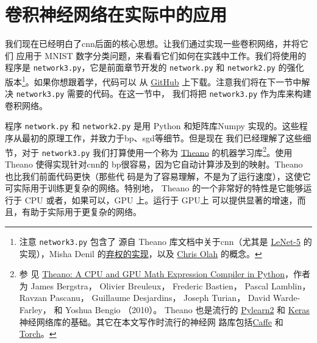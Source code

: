 \section{卷积神经网络在实际中的应用}
\label{seq:convolutional_neural_networks_in_practice}

我们现在已经明白了\gls*{cnn}后面的核心思想。让我们通过实现一些卷积网络，并将它们
应用于 MNIST 数字分类问题，来看看它们如何在实践中工作。我们将使用的程序是
\lstinline!network3.py!，它是前面章节开发的 \lstinline!network.py! 和
\lstinline!network2.py! 的强化版本\footnote{注意 \lstinline!network3.py! 包含了
  源自 Theano 库文档中关于\gls*{cnn}（尤其是
    \href{http://deeplearning.net/tutorial/lenet.html}{LeNet-5} 的实现），Misha
  Denil 的\href{https://github.com/mdenil/dropout}{弃权的实现}，以及
  \href{http://colah.github.io/}{Chris Olah} 的概念。}。如果你想跟着学，代码可以
从
\href{https://github.com/mnielsen/neural-networks-and-deep-learning/blob/master/src/network3.py}{GitHub}
上下载。注意我们将在下一节中解决 \lstinline!network3.py! 需要的代码。在这一节中，
我们将把 \lstinline!network3.py! 作为库来构建卷积网络。

程序 \lstinline!network.py! 和 \lstinline!network2.py! 是用 Python 和矩阵库Numpy
实现的。这些程序从最初的原理工作，并致力于\gls*{bp}、\gls*{sgd}等细节。但是现在
我们已经理解了这些细节，对于 \lstinline!network3.py! 我们打算使用一个称为
\href{http://deeplearning.net/software/theano/}{Theano} 的机器学习库\footnote{参
  见
  \href{http://www.iro.umontreal.ca/~lisa/pointeurs/theano_scipy2010.pdf}{Theano:
    A CPU and GPU Math Expression Compiler in Python}，作者为 James Bergstra，
  Olivier Breuleux， Frederic Bastien， Pascal Lamblin， Ravzan Pascanu，
  Guillaume Desjardins， Joseph Turian， David Warde-Farley， 和 Yoshua Bengio
  （2010）。 Theano 也是流行的
  \href{http://deeplearning.net/software/pylearn2/}{Pylearn2} 和
  \href{http://keras.io/}{Keras} 神经网络库的基础。其它在本文写作时流行的神经网
  路库包括\href{http://caffe.berkeleyvision.org/}{Caffe} 和
  \href{http://torch.ch/}{Torch}。}。使用 Theano 使得实现针对\gls*{cnn}的%
\gls*{bp}很容易，因为它自动计算涉及到的映射。Theano 也比我们前面代码更快（那些代
  码是为了容易理解，不是为了运行速度），这使它可实际用于训练更复杂的网络。特别地，
Theano 的一个非常好的特性是它能够运行于 CPU 或者，如果可以，GPU 上。运行于 GPU上
可以提供显著的增速，而且，有助于实际用于更复杂的网络。

